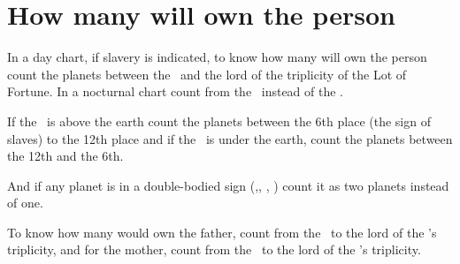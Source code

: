 \section{How many will own the person}

In a day chart, if slavery is indicated, to know how many will own the person count the planets between the \Sun\, and the lord of the triplicity of the Lot of Fortune. In a nocturnal chart count from the \Moon\, instead of the \Sun.

If the \Moon\, is above the earth count the planets between the 6th place (the sign of slaves) to the 12th place and if the \Moon\, is under the earth, count the planets between the 12th and the 6th.

And if any planet is in a double-bodied sign (\Gemini,\Virgo, \Sagittarius, \Pisces) count it as two planets instead of one.

To know how many would own the father, count from the \Sun\, to the lord of the \Sun's triplicity, and for the mother, count from the \Moon\, to the lord of the \Moon's triplicity.

